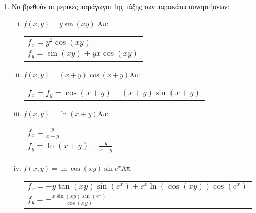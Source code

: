 




\everymath{\displaystyle}



\begin{center}
\end{center}

\vspace{\baselineskip}

\begin{enumerate}
\item Να βρεθούν οι μερικές παράγωγοι 1ης τάξης των παρακάτω συναρτήσεων:

\begin{enumerate}[i)]

\item $f(x,y)=y\sin (xy)$ \hfill Απ: \begin{tabular}{l} $\scriptstyle{f_x=y^2\cos(xy)}$ \\ $\scriptstyle{f_y=\sin(xy)+yx\cos(xy)}$\end{tabular}

\item $f(x,y)=(x+y)\cos(x+y)$\hfill Απ: \begin{tabular}{l} $\scriptstyle{f_x=f_y=\cos(x+y)-(x+y)\sin(x+y)}$\end{tabular}

\item $f(x,y)=\ln(x+y)$\hfill Απ: \begin{tabular}{l} $\scriptstyle{f_x=\frac{y}{x+y}}$ \\ $\scriptstyle{f_y=\ln(x+y)+\frac{y}{x+y}}$\end{tabular}


\item $f(x,y)=\ln\cos(xy)\sin e^x$\hfill Απ: \begin{tabular}{l} $\scriptstyle{f_x=-y\tan (xy)\sin(e^x)+e^x\ln(\cos(xy))\cos(e^x)}$ \\ $\scriptstyle{f_y=-\frac{x\sin(xy)\sin(e^x)}{\cos(xy)}}$\end{tabular}


\end{enumerate}
\end{enumerate}
